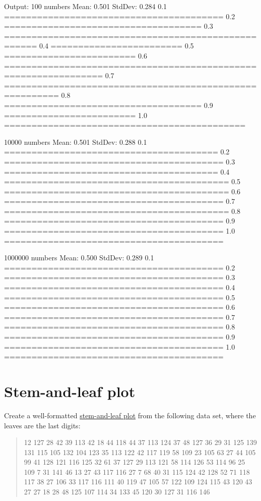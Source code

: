 \begin{wideverbatim}


Output:
100 numbers
Mean:   0.501
StdDev: 0.284
0.1 ========================================
0.2 ====================================
0.3 ====================================================
0.4 ========================
0.5 ========================
0.6 ================================================================
0.7 ========================================================
0.8 ====================================
0.9 ========================
1.0 ============================================

10000 numbers
Mean:   0.501
StdDev: 0.288
0.1 =======================================
0.2 ========================================
0.3 =======================================
0.4 =========================================
0.5 =========================================
0.6 ========================================
0.7 =========================================
0.8 ========================================
0.9 ========================================
1.0 ========================================

1000000 numbers
Mean:   0.500
StdDev: 0.289
0.1 ========================================
0.2 ========================================
0.3 ========================================
0.4 ========================================
0.5 ========================================
0.6 ========================================
0.7 ========================================
0.8 ========================================
0.9 ========================================
1.0 ========================================

\end{wideverbatim}

\pagebreak{}
\section*{Stem-and-leaf plot}

Create a well-formatted
\href{http://en.wikipedia.org/wiki/Stem-and-leaf\_plot}{stem-and-leaf
plot} from the following data set, where the leaves are the last digits:

\begin{quote}
12 127 28 42 39 113 42 18 44 118 44 37 113 124 37 48 127 36 29 31 125
139 131 115 105 132 104 123 35 113 122 42 117 119 58 109 23 105 63 27 44
105 99 41 128 121 116 125 32 61 37 127 29 113 121 58 114 126 53 114 96
25 109 7 31 141 46 13 27 43 117 116 27 7 68 40 31 115 124 42 128 52 71
118 117 38 27 106 33 117 116 111 40 119 47 105 57 122 109 124 115 43 120
43 27 27 18 28 48 125 107 114 34 133 45 120 30 127 31 116 146
\end{quote}

